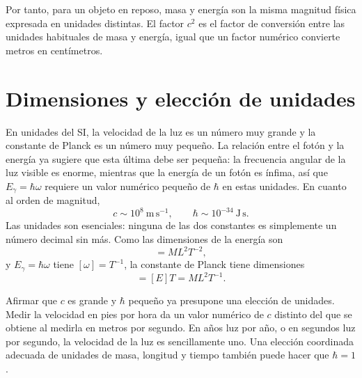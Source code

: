 Por tanto, para un objeto en reposo, masa y energía son la misma magnitud física expresada en unidades distintas. El factor \(c^2\) es el factor de conversión entre las unidades habituales de masa y energía, igual que un factor numérico convierte metros en centímetros.

\begin{classroomqa}\end{classroomqa}

\section{Dimensiones y elección de unidades}

En unidades del SI, la velocidad de la luz es un número muy grande y la constante de Planck es un número muy pequeño. La relación entre el fotón y la energía ya sugiere que esta última debe ser pequeña: la frecuencia angular de la luz visible es enorme, mientras que la energía de un fotón es ínfima, así que \(E_\gamma=\hbar\omega\) requiere un valor numérico pequeño de \(\hbar\) en estas unidades. En cuanto al orden de magnitud,
\begin{equation}
c\sim 10^8\ \mathrm{m\,s^{-1}},
\qquad
\hbar\sim 10^{-34}\ \mathrm{J\,s}.
\end{equation}
Las unidades son esenciales: ninguna de las dos constantes es simplemente un número decimal sin más. Como las dimensiones de la energía son
\begin{equation}
[E]=M L^2 T^{-2},
\end{equation}
y \(E_\gamma=\hbar\omega\) tiene \([\omega]=T^{-1}\), la constante de Planck tiene dimensiones
\begin{equation}
[\hbar]=[E]T=M L^2 T^{-1}.
\end{equation}

Afirmar que \(c\) es grande y \(\hbar\) pequeño ya presupone una elección de unidades. Medir la velocidad en pies por hora da un valor numérico de \(c\) distinto del que se obtiene al medirla en metros por segundo. En años luz por año, o en segundos luz por segundo, la velocidad de la luz es sencillamente uno. Una elección coordinada adecuada de unidades de masa, longitud y tiempo también puede hacer que \(\hbar=1\).

